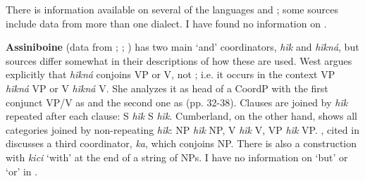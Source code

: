 \documentclass[output=paper]{LSP/langsci}
\begin{document}
There is information available on several of the  languages and ; some sources include data from more than one dialect. I have found no information on .

\textbf{Assiniboine} (data from \citealt{West2003}; \citealt{Cumberland2005}; \citealt{Levin1964}) has two main `and' coordinators, \textit{h\~ik} and \textit{h\~ikná}, but sources differ somewhat in their descriptions of how these are used. West argues explicitly that \textit{h\~ikná} conjoins VP or V, not ; i.e. it occurs in the context VP \textit{h\~ikná} VP or V \textit{h\~ikná} V. She analyzes it as head of a CoordP with the first conjunct VP/V as  and the second one as  (pp. 32-38). Clauses are joined by \textit{h\~ik} repeated after each clause: S \textit{h\~ik} S \textit{h\~ik}. Cumberland, on the other hand, shows all categories joined by non-repeating \textit{h\~ik}: NP \textit{h\~ik} NP, V \textit{h\~ik} V, VP \textit{h\~ik} VP. \citet{Levin1964}, cited in \citet[36]{Stassen2000} discusses a third coordinator, \textit{ka}, which conjoins NP. There is also a  construction with \textit{kici} `with' at the end of a string of NPs. I have no information on `but' or `or' in .
\end{document}
